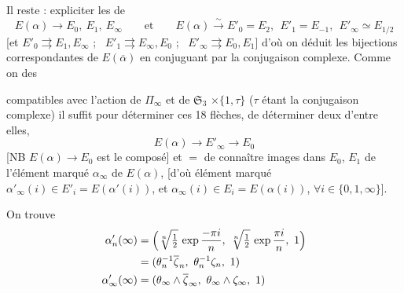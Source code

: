 \documentclass[11pt,a4paper]{article}
\begin{document}
Il reste  : expliciter les  de 
\[
  E(\alpha) \longrightarrow E_0,\ E_1,\ E_\infty
  \qquad \text{et} \qquad
  E(\alpha) \xrightarrow{\ \sim\ } E'_0 = E_2,\ \ E'_1 = E_{-1},\ \ E'_\infty \simeq E_{1/2}
\]
[et $E'_0 \rightrightarrows E_1, E_\infty$ ; \ $E'_1 \rightrightarrows E_\infty, E_0$ \struck{\ill{}} ; \ $E'_\infty \rightrightarrows E_0, E_1$]
d'où on déduit les bijections correspondantes 
de $E(\overline{\alpha})$ en conjuguant par la conjugaison complexe. Comme on   des 

compatibles avec l'action de $\Pi_\infty$ et de $\mathfrak{S}_3$ \struck{\ill{}} $\times \{1, \tau\}$ ($\tau$ étant la conjugaison complexe) il suffit pour déterminer ces 18 flèches, de déterminer deux d'entre elles,  
\[
  E(\alpha) \longrightarrow E'_\infty \longrightarrow E_0
\]
[NB $E(\alpha) \to E_0$ est le composé] et $=$ de connaître  images dans $E_0$, $E_1$ de l'élément marqué $\alpha_\infty$ de $E(\alpha)$, [d'où élément marqué $\alpha'_\infty(i) \in E'_i = E(\alpha'(i))$, et $\alpha_\infty(i) \in E_i = E(\alpha(i))$, $\forall i \in \{0, 1, \infty\}$].

On trouve
\[
  \begin{aligned}
    \alpha'_n(\infty) &= \Bigl(\sqrt[n]{\tfrac12}\, \exp\frac{-\pi i}{n},\ \sqrt[n]{\tfrac12}\, \exp\frac{\pi i}{n},\ 1\Bigr) \\
    &= (\theta_n^{-1} \overline{\zeta}_n,\ \theta_n^{-1} \zeta_n,\ 1) \\
    \alpha'_\infty(\infty) &= (\theta_\infty \wedge \overline{\zeta}_\infty,\ \theta_\infty \wedge \zeta_\infty,\ 1)
  \end{aligned}
\]
\end{document}
